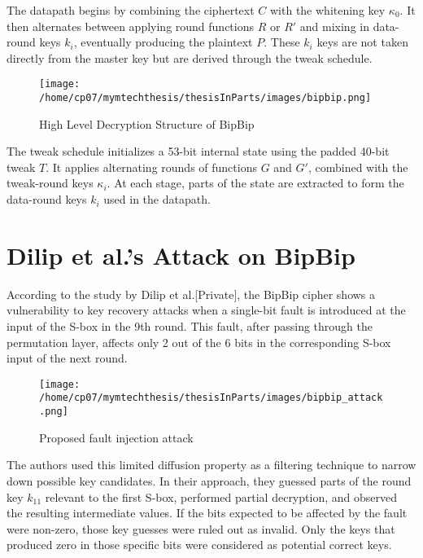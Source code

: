 The datapath begins by combining the ciphertext $C$ with the whitening key $\kappa_0$. It then alternates between applying round functions $R$ or $R'$ and mixing in data-round keys $k_i$, eventually producing the plaintext $P$. These $k_i$ keys are not taken directly from the master key but are derived through the tweak schedule.
\begin{figure}[h]
    \centering
    \texttt{[image: /home/cp07/mymtechthesis/thesisInParts/images/bipbip.png]}
    \caption{High Level Decryption Structure of BipBip}
    \label{fig:bipbip_decrypt_structure}
\end{figure}


The tweak schedule initializes a 53-bit internal state using the padded 40-bit tweak $T$. It applies alternating rounds of functions $G$ and $G'$, combined with the tweak-round keys $\kappa_i$. At each stage, parts of the state are extracted to form the data-round keys $k_i$ used in the datapath.

\section{Dilip et al.'s Attack on BipBip}
According to the study by Dilip et al.[Private], the BipBip cipher shows a vulnerability to key recovery attacks when a single-bit fault is introduced at the input of the S-box in the 9th round. This fault, after passing through the permutation layer, affects only 2 out of the 6 bits in the corresponding S-box input of the next round. 
\begin{figure}[h]
    \centering
    \texttt{[image: /home/cp07/mymtechthesis/thesisInParts/images/bipbip\_attack.png]}
    \caption{Proposed fault injection attack}
    \label{fig:bipbip_attack}
\end{figure}
The authors used this limited diffusion property as a filtering technique to narrow down possible key candidates.
In their approach, they guessed parts of the round key $k_{11}$ relevant to the first S-box, performed partial decryption, and observed the resulting intermediate values. If the bits expected to be affected by the fault were non-zero, those key guesses were ruled out as invalid. Only the keys that produced zero in those specific bits were considered as potential correct keys.




